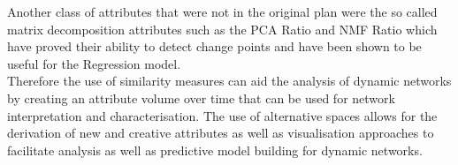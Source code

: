 Another class of attributes that were not in the original plan were the so called matrix decomposition attributes such as the PCA Ratio and NMF Ratio which have proved their ability to detect change points and have been shown to be useful for the Regression model. \\

Therefore the use of similarity measures can aid the analysis of dynamic networks by creating an attribute volume over time that can be used for network interpretation and characterisation. The use of alternative spaces allows for the derivation of new and creative attributes as well as visualisation approaches to facilitate analysis as well as predictive model building for dynamic networks. \\